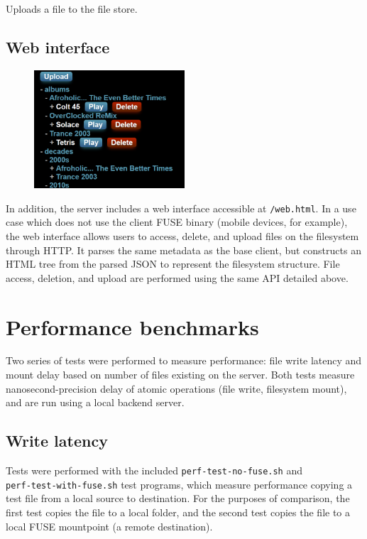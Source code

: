 \documentclass{article}
\begin{document}
	\noindent Uploads a file to the file store.
	
	\subsection{Web interface}
	 
	\begin{figure}
		\centering
		\vspace{-0.025\textheight}
		\includegraphics[width=0.5\textwidth]{web-screenshot}
		
	\end{figure}
	In addition, the server includes a web interface accessible at \texttt{/web.html}. In a use case which does not use the client FUSE binary (mobile devices, for example), the web interface allows users to access, delete, and upload files on the filesystem through HTTP.  It parses the same metadata as the base client, but constructs an HTML tree from the parsed JSON to represent the filesystem structure. File access, deletion, and upload are performed using the same API detailed above.

	\pagebreak \restoregeometry
	
	\section{Performance benchmarks} 
	Two series of tests were performed to measure performance: file write latency and mount delay based on number of files existing on the server. Both tests measure nanosecond-precision delay of atomic operations (file write, filesystem mount), and are run using a local backend server.
	
	\subsection{Write latency}
	Tests were performed with the included \texttt{perf-test-no-fuse.sh} and \\ \texttt{perf-test-with-fuse.sh} test programs, which measure performance copying a test file from a local source to destination. For the purposes of comparison, the first test copies the file to a local folder, and the second test copies the file to a local FUSE mountpoint (a remote destination). \\
	
\end{document}
